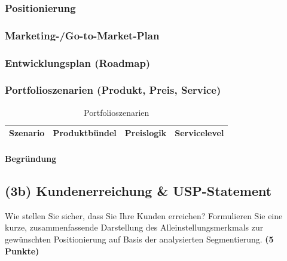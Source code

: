 \documentclass[
%
ngerman %
%
numeric %
]{wbh-assignment}
\begin{document}
\subsubsection{Positionierung}

\subsubsection{Marketing-/Go-to-Market-Plan}

\subsubsection{Entwicklungsplan (Roadmap)}

\subsubsection{Portfolioszenarien (Produkt, Preis, Service)}
\begin{table}[htb!]
\centering
\caption{Portfolioszenarien}
\begin{tabular}{l l l l}
\textbf{Szenario} & \textbf{Produktbündel} & \textbf{Preislogik} & \textbf{Servicelevel} \\
\hline
\end{tabular}
\end{table}

\paragraph{Begründung}

\subsection{(3b) Kundenerreichung \& USP-Statement}
\begin{aufgabenstellung}
Wie stellen Sie sicher, dass Sie Ihre Kunden erreichen? Formulieren Sie eine kurze, zusammenfassende Darstellung des Alleinstellungsmerkmals zur gewünschten Positionierung auf Basis der analysierten Segmentierung. \textbf{(5 Punkte)}
\end{aufgabenstellung}
\end{document}
